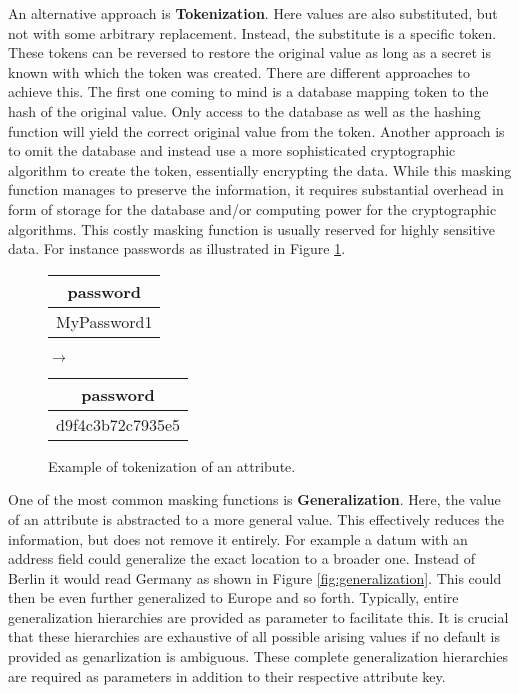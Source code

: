 An alternative approach is \textbf{Tokenization}. Here values are also substituted, but not with some arbitrary replacement. Instead, the substitute is a specific token. These tokens can be reversed to restore the original value as long as a secret is known with which the token was created. There are different approaches to achieve this. The first one coming to mind is a database mapping token to the hash of the original value. Only access to the database as well as the hashing function will yield the correct original value from the token. Another approach is to omit the database and instead use a more sophisticated cryptographic algorithm to create the token, essentially encrypting the data. While this masking function manages to preserve the information, it requires substantial overhead in form of storage for the database and/or computing power for the cryptographic algorithms. This costly masking function is usually reserved for highly sensitive data. For instance passwords as illustrated in Figure \ref{fig:tokenization}.

\bigskip

\begin{figure}[ht]
    \begin{center}
    \footnotesize{
        \renewcommand{\arraystretch}{1.5}
        \begin{tabular}{|c|}
            \hline
            password \\
            \hline
            MyPassword1 \\
            \hline
            \end{tabular}
            \quad $\longrightarrow$ \quad
            \begin{tabular}{|c|}
            \hline
            password \\
            \hline
            d9f4c3b72c7935e5 \\
            \hline
        \end{tabular}
    }
    \end{center}
    \caption{Example of tokenization of an attribute.\label{fig:tokenization}}
\end{figure}

One of the most common masking functions is \textbf{Generalization}. Here, the value of an attribute is abstracted to a more general value. This effectively reduces the information, but does not remove it entirely. For example a datum with an address field could generalize the exact location to a broader one. Instead of Berlin it would read Germany as shown in Figure \ref{fig:generalization}. This could then be even further generalized to Europe and so forth. Typically, entire generalization hierarchies are provided as parameter to facilitate this. It is crucial that these hierarchies are exhaustive of all possible arising values if no default is provided as genarlization is ambiguous. These complete generalization hierarchies are required as parameters in addition to their respective attribute key. 

